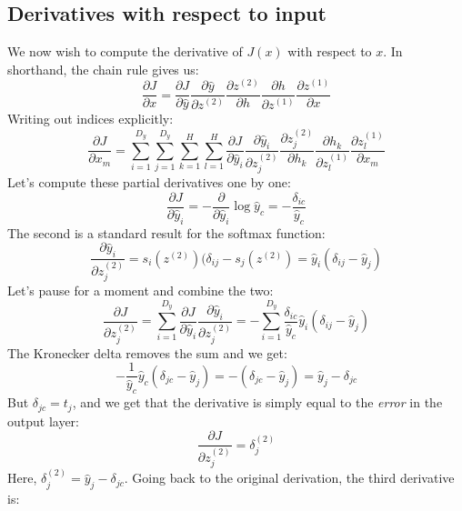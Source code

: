 \documentclass[12pt, a4paper]{article}
\numberwithin{equation}{section}
\begin{document}
\subsection{Derivatives with respect to input}
We now wish to compute the derivative of $J(x)$ with respect to $x$. In shorthand, the chain rule gives us:
\begin{equation}
\frac{\partial J}{\partial x}=\frac{\partial J}{\partial\hat{y}}\frac{\partial \hat{y}}{\partial z^{(2)}}\frac{\partial z^{(2)}}{\partial h}\frac{\partial h}{\partial z^{(1)}}\frac{\partial z^{(1)}}{\partial x}
\end{equation}
Writing out indices explicitly:
\begin{equation}
\frac{\partial J}{\partial x_m}=\sum_{i=1}^{D_y}\sum_{j=1}^{D_y}\sum_{k=1}^H\sum_{l=1}^H\frac{\partial J}{\partial\hat{y}_i}\frac{\partial \hat{y}_i}{\partial z^{(2)}_j}\frac{\partial z^{(2)}_j}{\partial h_k}\frac{\partial h_k}{\partial z^{(1)}_l}\frac{\partial z^{(1)}_l}{\partial x_m}
\end{equation}
Let's compute these partial derivatives one by one:
\begin{equation}
\frac{\partial J}{\partial\hat{y}_i}=-\frac{\partial}{\partial\hat{y}_i}\log\hat{y}_c=-\frac{\delta_{ic}}{\hat{y}_c}
\end{equation}
The second is a standard result for the softmax function:
\begin{equation}
\frac{\partial \hat{y}_i}{\partial z^{(2)}_j}=s_i(z^{(2)})(\delta_{ij}-s_j(z^{(2)})=\hat{y}_i(\delta_{ij}-\hat{y}_j)
\end{equation}
Let's pause for a moment and combine the two:
\begin{equation}
\label{output_derivative}
\frac{\partial J}{\partial z^{(2)}_j}=\sum_{i=1}^{D_y}\frac{\partial J}{\partial\hat{y}_i}\frac{\partial \hat{y}_i}{\partial z^{(2)}_j}=-\sum_{i=1}^{D_y}\frac{\delta_{ic}}{\hat{y}_c}\hat{y}_i(\delta_{ij}-\hat{y}_j)
\end{equation}
The Kronecker delta removes the sum and we get:
\begin{equation}
-\frac{1}{\hat{y}_c}\hat{y}_c(\delta_{jc}-\hat{y}_j)=-(\delta_{jc}-\hat{y}_j)=\hat{y}_j-\delta_{jc}
\end{equation}
But $\delta_{jc}=t_j$, and we get that the derivative is simply equal to the \textit{error} in the output layer:
\begin{equation}
\label{ce_softmax}
\frac{\partial J}{\partial z^{(2)}_j}=\delta^{(2)}_j
\end{equation}
Here, $\delta^{(2)}_j=\hat{y}_j-\delta_{jc}$. Going back to the original derivation, the third derivative is:
\end{document}
